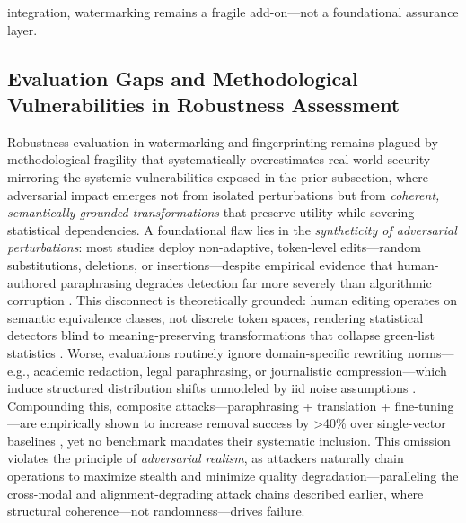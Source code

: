 \documentclass[11pt,a4paper]{article}
\begin{document}
integration, watermarking remains a fragile add-on---not a foundational assurance layer.


\subsection{Evaluation Gaps and Methodological Vulnerabilities in Robustness Assessment}


Robustness evaluation in watermarking and fingerprinting remains plagued by methodological fragility that systematically overestimates real-world security---mirroring the systemic vulnerabilities exposed in the prior subsection, where adversarial impact emerges not from isolated perturbations but from \emph{coherent, semantically grounded transformations} that preserve utility while severing statistical dependencies. A foundational flaw lies in the \emph{syntheticity of adversarial perturbations}: most studies deploy non-adaptive, token-level edits---random substitutions, deletions, or insertions---despite empirical evidence that human-authored paraphrasing degrades detection far more severely than algorithmic corruption \cite{doi:10.18653/v1/2024.findings-naacl.40,arxiv:2402.19361}. This disconnect is theoretically grounded: human editing operates on semantic equivalence classes, not discrete token spaces, rendering statistical detectors blind to meaning-preserving transformations that collapse green-list statistics \cite{arxiv:2505.06827}. Worse, evaluations routinely ignore domain-specific rewriting norms---e.g., academic redaction, legal paraphrasing, or journalistic compression---which induce structured distribution shifts unmodeled by iid noise assumptions \cite{doi:10.1609/aaai.v36i10.21415,arxiv:2505.02884}. Compounding this, composite attacks---paraphrasing + translation + fine-tuning---are empirically shown to increase removal success by >40\% over single-vector baselines \cite{arxiv:2402.14007}, yet no benchmark mandates their systematic inclusion. This omission violates the principle of \emph{adversarial realism}, as attackers naturally chain operations to maximize stealth and minimize quality degradation---paralleling the cross-modal and alignment-degrading attack chains described earlier, where structural coherence---not randomness---drives failure.
\end{document}
